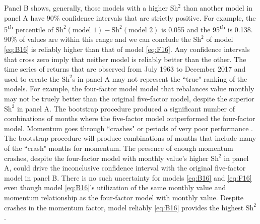 Panel B shows,
generally, those models with a higher $\text{Sh}^2$ than another model in panel
A have 90\% confidence intervals that are
strictly positive. For example, the 5\textsuperscript{th} percentile of
$\text{Sh}^2(\text{model 1})-\text{Sh}^2(\text{model 2})$ is 0.055 and the
95\textsuperscript{th} is 0.138. 90\% of values are within this range and we
can conclude the $\text{Sh}^2$ of model \ref{eq:B16} is reliably higher
than that of model \ref{eq:F16}.
Any confidence intervals that cross zero imply that neither model is reliably
better than the other. The time series of returns that are observed from July
1963 to December 2017 and used to create the $\text{Sh}^2$s in panel A may not
represent the ``true" ranking of the models.
For example, the four-factor model
model that rebalances value monthly may not be truely
better than the original five-factor model, despite the superior $\text{Sh}^2$
in panel A. The bootstrap procedure produced a significant number of
combinations of months where the five-factor model
outperformed the four-factor model.
Momentum goes through ``crashes" or periods of very poor performance
\parencite{daniel2016momentum, barroso2015momentum}.
The bootstrap procedure will produce combinations of months that include
many of the ``crash" months for momentum.
The presence of enough momentum crashes, despite the four-factor model with
monthly value's higher $\text{Sh}^2$ 
in panel A, could drive the inconclusive confidence interval with the original
five-factor model in panel B.
There is no such uncertainty for models \ref{eq:B16} and \ref{eq:F16}
even though
model \ref{eq:B16}'s utilization of the same monthly value and momentum
relationship as the four-factor model with monthly value.
Despite crashes in the momentum factor, model reliably \ref{eq:B16} provides
the highest $\text{Sh}^2$.

